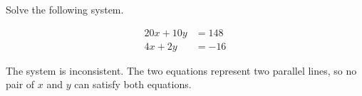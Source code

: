 
\begin{question}
Solve the following system.

\[\begin{aligned}
20 x + 10 y&=148\\
4 x + 2 y&=-16
\end{aligned}\]
\end{question}

\begin{solution}
The system is inconsistent. The two equations represent two parallel
lines, so no pair of \(x\) and \(y\) can satisfy both equations.
\end{solution}

